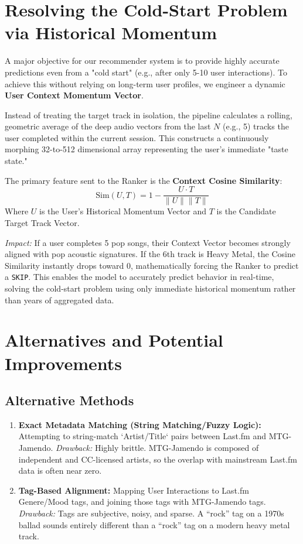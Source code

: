 \documentclass[12pt, letterpaper]{article}
\begin{document}
\section{Resolving the Cold-Start Problem via Historical Momentum}
A major objective for our recommender system is to provide highly accurate predictions even from a "cold start" (e.g., after only 5-10 user interactions). To achieve this without relying on long-term user profiles, we engineer a dynamic \textbf{User Context Momentum Vector}.

Instead of treating the target track in isolation, the pipeline calculates a rolling, geometric average of the deep audio vectors from the last \( N \) (e.g., 5) tracks the user completed within the current session. This constructs a continuously morphing 32-to-512 dimensional array representing the user's immediate "taste state."

The primary feature sent to the Ranker is the \textbf{Context Cosine Similarity}:
\[ \text{Sim}(U, T) = 1 - \frac{U \cdot T}{\|U\| \|T\|} \]
Where \( U \) is the User's Historical Momentum Vector and \( T \) is the Candidate Target Track Vector.

\textit{Impact:} If a user completes 5 pop songs, their Context Vector becomes strongly aligned with pop acoustic signatures. If the 6th track is Heavy Metal, the Cosine Similarity instantly drops toward 0, mathematically forcing the Ranker to predict a \texttt{SKIP}. This enables the model to accurately predict behavior in real-time, solving the cold-start problem using only immediate historical momentum rather than years of aggregated data.

\section{Alternatives and Potential Improvements}

\subsection{Alternative Methods}
\begin{enumerate}
    \item \textbf{Exact Metadata Matching (String Matching/Fuzzy Logic):} Attempting to string-match `Artist/Title` pairs between Last.fm and MTG-Jamendo. 
    \textit{Drawback:} Highly brittle. MTG-Jamendo is composed of independent and CC-licensed artists, so the overlap with mainstream Last.fm data is often near zero.
    \item \textbf{Tag-Based Alignment:} Mapping User Interactions to Last.fm Genere/Mood tags, and joining those tags with MTG-Jamendo tags.
    \textit{Drawback:} Tags are subjective, noisy, and sparse. A ``rock'' tag on a 1970s ballad sounds entirely different than a ``rock'' tag on a modern heavy metal track.
\end{enumerate}
\end{document}
